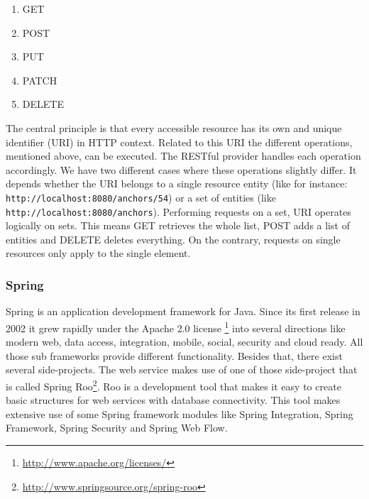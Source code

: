 \begin{enumerate}
\item GET
\item POST
\item PUT
\item PATCH
\item DELETE
\end{enumerate}

The central principle is that every accessible resource has its own and unique identifier (URI) in HTTP context. Related to this URI the different operations, mentioned above, can be executed. The RESTful provider handles each operation accordingly. We have two different cases where these operations slightly differ. It depends whether the URI belongs to a single resource entity (like for instance: \verb^http://localhost:8080/anchors/54^) or a set of entities (like \verb^http://localhost:8080/anchors^). Performing requests on a set, URI operates logically on sets. This means GET retrieves the whole list, POST adds a list of entities and DELETE deletes everything. On the contrary, requests on single resources only apply to the single element.  
	
\subsubsection*{Spring}
Spring is an application development framework for Java. Since its first release in 2002 it grew rapidly under the Apache 2.0 license \footnote{\url{http://www.apache.org/licenses/}} into several directions like modern web, data access, integration, mobile, social, security and cloud ready. All those sub frameworks provide different functionality. Besides that, there exist several side-projects. The web service makes use of one of those side-project that is called Spring Roo\footnote{\url{http://www.springsource.org/spring-roo}}. Roo is a development tool that makes it easy to create basic structures for web services with database connectivity. This tool makes extensive use of some Spring framework modules like Spring Integration, Spring Framework, Spring Security and Spring Web Flow. 
	
